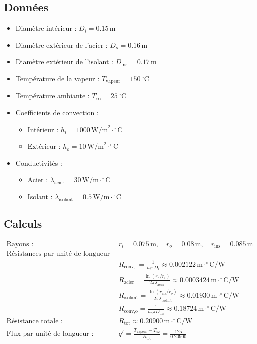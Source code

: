 \documentclass{rapportECL}
\begin{document}
\subsection*{Données}
\begin{itemize}
    \item Diamètre intérieur : \( D_i = 0.15 \, \text{m} \)
    \item Diamètre extérieur de l'acier : \( D_o = 0.16 \, \text{m} \)
    \item Diamètre extérieur de l'isolant : \( D_{\text{ins}} = 0.17 \, \text{m} \)
    \item Température de la vapeur : \( T_{\text{vapeur}} = 150 \, ^\circ \text{C} \)
    \item Température ambiante : \( T_{\infty} = 25 \, ^\circ \text{C} \)
    \item Coefficients de convection :
        \begin{itemize}
            \item Intérieur : \( h_i = 1000 \, \text{W/m}^2 \cdot ^\circ \text{C} \)
            \item Extérieur : \( h_o = 10 \, \text{W/m}^2 \cdot ^\circ \text{C} \)
        \end{itemize}
    \item Conductivités :
        \begin{itemize}
            \item Acier : \( \lambda_{\text{acier}} = 30 \, \text{W/m} \cdot ^\circ \text{C} \)
            \item Isolant : \( \lambda_{\text{isolant}} = 0.5 \, \text{W/m} \cdot ^\circ \text{C} \)
        \end{itemize}
\end{itemize}

\subsection*{Calculs}
\begin{align*}
\text{Rayons : } & r_i = 0.075 \, \text{m}, \quad r_o = 0.08 \, \text{m}, \quad r_{\text{ins}} = 0.085 \, \text{m} \\
\text{Résistances par unité de longueur : } & \\
& R_{\text{conv,i}} = \frac{1}{h_i \pi D_i} \approx 0.002122 \, \text{m} \cdot ^\circ \text{C/W} \\
& R_{\text{acier}} = \frac{\ln(r_o / r_i)}{2\pi \lambda_{\text{acier}}} \approx 0.0003424 \, \text{m} \cdot ^\circ \text{C/W} \\
& R_{\text{isolant}} = \frac{\ln(r_{\text{ins}} / r_o)}{2\pi \lambda_{\text{isolant}}} \approx 0.01930 \, \text{m} \cdot ^\circ \text{C/W} \\
& R_{\text{conv,o}} = \frac{1}{h_o \pi D_{\text{ins}}} \approx 0.18724 \, \text{m} \cdot ^\circ \text{C/W} \\
\text{Résistance totale : } & R_{\text{tot}} \approx 0.20900 \, \text{m} \cdot ^\circ \text{C/W} \\
\text{Flux par unité de longueur : } & q' = \frac{T_{\text{vapeur}} - T_{\infty}}{R_{\text{tot}}} = \frac{125}{0.20900}
\end{align*}
\end{document}

